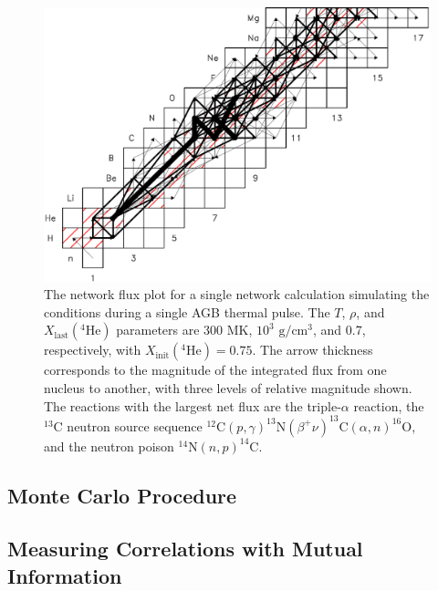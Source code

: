 \begin{figure}[t]
\centering
\includegraphics[width=6.5in]{Chapter-3/figs/Flux_300MK_1d3.png}
\caption{\label{fig:Flux}The network flux plot for a single network calculation simulating the conditions during a single AGB thermal pulse. The $T$, $\rho$, and $X_{\mathrm{last}}(^{4}\mathrm{He})$ parameters are 300 MK, $10^{3}$ $\mathrm{g}/\mathrm{cm}^{3}$, and 0.7, respectively, with $X_{\mathrm{init}}(^{4}\mathrm{He}) = 0.75$. The arrow thickness corresponds to the magnitude of the integrated flux from one nucleus to another, with three levels of relative magnitude shown. The reactions with the largest net flux are the triple-$\alpha$ reaction, the $^{13}$C neutron source sequence $^{12}\mathrm{C}(p,\gamma)^{13}\mathrm{N}(\beta^{+}\nu)^{13}\mathrm{C}(\alpha,n)^{16}\mathrm{O}$, and the neutron poison $^{14}\mathrm{N}(n,p)^{14}\mathrm{C}$.}
\end{figure}


\subsection{Monte Carlo Procedure}


\subsection{Measuring Correlations with Mutual Information}

